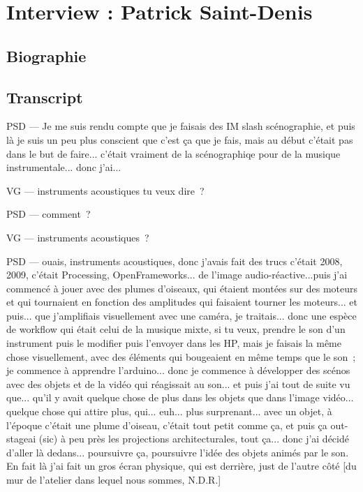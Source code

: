 \chapter{Interview : Patrick Saint-Denis}
\label{appendix:saint-denis}

\section*{Biographie}


\section*{Transcript}

PSD — Je me suis rendu compte que je faisais des IM slash scénographie, et puis là je suis un peu plus conscient que c'est ça que je fais, mais au début c'était pas dans le but de faire... c'était vraiment de la scénographiqe pour de la musique instrumentale... donc j'ai...

VG — instruments acoustiques tu veux dire ?

PSD — comment ?

VG — instruments acoustiques ?

PSD — ouais, instruments acoustiques, donc j'avais fait des trucs c'était 2008, 2009, c'était Processing, OpenFrameworks... de l'image audio-réactive...puis j'ai commencé à jouer avec des plumes d'oiseaux, qui étaient montées sur des moteurs et qui tournaient en fonction des amplitudes qui faisaient tourner les moteurs... et puis... que j'amplifiais visuellement avec une caméra, je traitais... donc une espèce de workflow qui était celui de la musique mixte, si tu veux, prendre le son d'un instrument puis le modifier puis l'envoyer dans les HP, mais je faisais la même chose visuellement, avec des éléments qui bougeaient en même temps que le son ; je commence à apprendre l'arduino... donc je commence à développer des scénos avec des objets et de la vidéo qui réagissait au son... et puis j'ai tout de suite vu que... qu'il y avait quelque chose de plus dans les objets que dans l'image vidéo... quelque chose qui attire plus, qui... euh... plus surprenant... avec un objet, à l'époque c'était une plume d'oiseau, c'était tout petit comme ça, et puis ça out-stageai (sic) à peu près les projections architecturales, tout ça... donc j'ai décidé d'aller là dedans... poursuivre ça, poursuivre l'idée des objets animés par le son. En fait là j'ai fait un gros écran physique, qui est derrière, just de l'autre côté [du mur de l'atelier dans lequel nous sommes, N.D.R.] 

